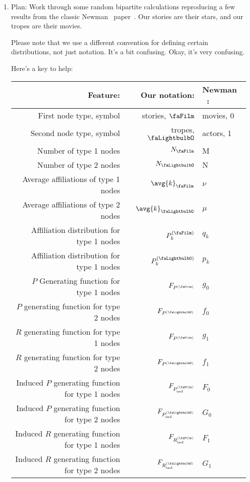 \begin{enumerate}
\begin{enumerate}
\begin{enumerate}
         \end{enumerate}

       \end{enumerate}

\item

  Plan: Work through some random bipartite calculations
  reproducing a few results from the classic Newman \etal\
  paper~\cite{newman2001b}.
  Our stories are their stars, and our tropes are their movies.

  Please note that we use a different convention for defining
  certain distributions, not just notation.  It's a bit confusing.
  Okay, it's very confusing.

  Here's a key to help:
  \begin{center}
    
    \begin{tabular}{|r|r|l|}
      \hline
      Feature: & Our notation: & Newman \etal~\cite{newman2001b}: \\
      \hline
  \hline
  First node type, symbol & stories, $\rbone$ & movies, 0 \\
  Second node type, symbol & tropes, $\rbtwo$ & actors, 1 \\
  Number of type 1 nodes & $\rboneng$ & M \\
  Number of type 2 nodes & $\rbtwong$ & N \\
  Average affiliations of type 1 nodes & $\avg{k}_{\rbone}$ & $\nu$ \\
  Average affiliations of type 2 nodes & $\avg{k}_{\rbtwo}$ & $\mu$ \\
  Affiliation distribution for type 1 nodes & $P^{(\rbone)}_{k}$ & $q_{k}$ \\
  Affiliation distribution for type 1 nodes & $P^{(\rbtwo)}_{k}$ & $p_{k}$ \\
  $P$ Generating function for type 1 nodes & $F_{P^{(\rbone)}}$ & $g_{0}$ \\
  $P$ generating function for type 2 nodes & $F_{P^{(\rbtwo)}}$ & $f_{0}$ \\
  $R$ generating function for type 1 nodes & $F_{P^{(\rbone)}}$ & $g_{1}$ \\
  $R$ generating function for type 2 nodes & $F_{P^{(\rbtwo)}}$ & $f_{1}$ \\
  Induced $P$ generating function for type 1 nodes & $F_{\Prboneindplain}$
  & $F_{0}$ \\
  Induced $P$ generating function for type 2 nodes & $F_{\Prbtwoindplain}$
  & $G_{0}$ \\
  Induced $R$ generating function for type 1 nodes & $F_{\Rrboneindplain}$
  & $F_{1}$ \\
  Induced $R$ generating function for type 2 nodes & $F_{\Rrbtwoindplain}$
  & $G_{1}$ \\
  \hline
    \end{tabular}
  \end{center}



\end{enumerate}
